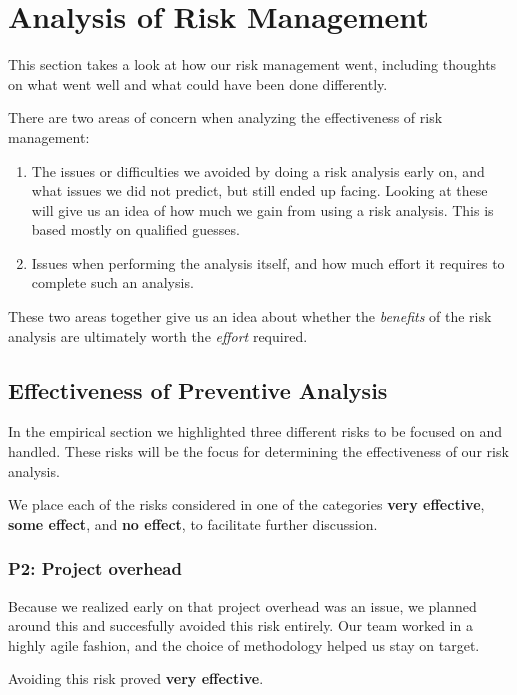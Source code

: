 \section{Analysis of Risk Management}
This section takes a look at how our risk management went, including thoughts on what went well and what could have been done differently.
\label{sec:AnalysisRiskManagement}

There are two areas of concern when analyzing the effectiveness of risk
management:

\begin{enumerate}
\item The issues or difficulties we avoided by doing a risk analysis early on,
and what issues we did not predict, but still ended up facing. Looking
at these will give us an idea of how much we gain from using a risk analysis.
This is based mostly on qualified guesses.

\item Issues when performing the analysis itself, and how much effort
it requires to complete such an analysis.
\end{enumerate}

These two areas together give us an idea about whether the \emph{benefits} of the risk analysis are
ultimately worth the \emph{effort} required.

\subsection{Effectiveness of Preventive Analysis}

In the empirical section we highlighted three different risks to be focused on and handled. These risks
will be the focus for determining the effectiveness of our risk analysis.

We place each of the risks considered in one of the categories \textbf{very effective}, \textbf{some
effect}, and \textbf{no effect}, to facilitate further discussion.

\subsubsection{P2: Project overhead}

Because we realized early on that project overhead was an issue, we planned around this and succesfully
avoided this risk entirely. Our team worked in a highly agile fashion, and the choice of methodology helped
us stay on target.

Avoiding this risk proved \textbf{very effective}.

